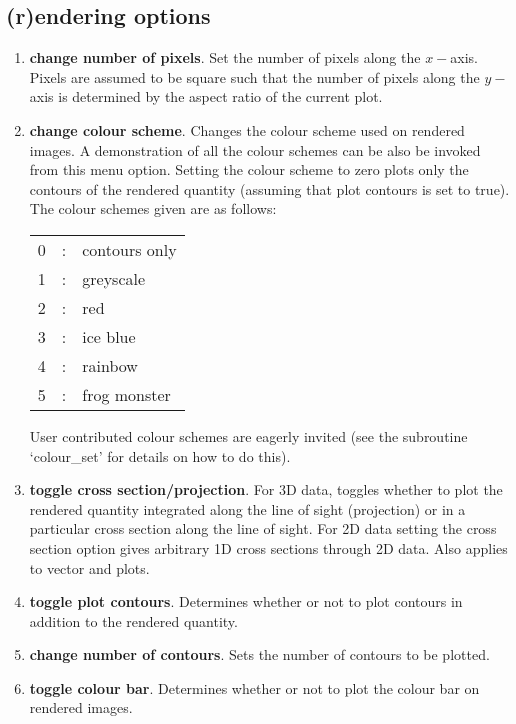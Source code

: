\documentclass[a4paper,12pt]{article}
\begin{document}
\subsection{(r)endering options}
\begin{enumerate}
\item \textbf{change number of pixels}. Set the number of pixels along the
$x-$axis. Pixels are assumed to be square such that the number of pixels along
the $y-$axis is determined by the aspect ratio of the current plot.
\item \textbf{change colour scheme}. Changes the colour scheme used on rendered
images. A demonstration of all the colour schemes can be also be invoked from
this menu option. Setting the colour scheme to zero plots only the contours of
the rendered quantity (assuming that plot contours is set to true). The colour
schemes given are as follows:

\begin{tabular}{rcp{}}
  0 & : & contours only \\
  1 & : & greyscale \\
  2 & : & red \\
  3 & : & ice blue \\
  4 & : & rainbow \\
  5 & : & frog monster
\end{tabular}

User contributed colour schemes are eagerly invited (see the subroutine
`colour\_set' for details on how to do this).
\item \textbf{toggle cross section/projection}. For 3D data, toggles whether to
plot the rendered quantity integrated along the line of sight (projection) or in
a particular cross section along the line of sight. For 2D data setting the
cross section option gives arbitrary 1D cross sections through 2D data. Also applies to vector and plots.
\item \textbf{toggle plot contours}. Determines whether or not to plot contours
in addition to the rendered quantity.
\item \textbf{change number of contours}. Sets the number of contours to be
plotted. 
\item \textbf{toggle colour bar}. Determines whether or not to plot the colour
bar on rendered images.
\end{enumerate}
\end{document}
